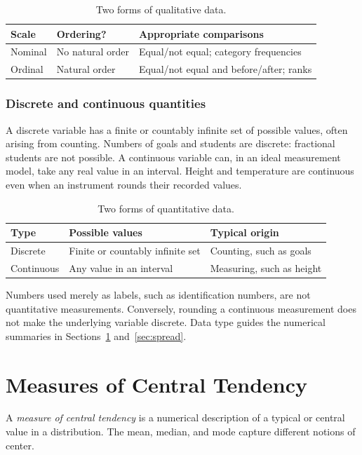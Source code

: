 \documentclass[11pt]{article}
\begin{document}
\begin{table}[ht]
\centering
\caption{Two forms of qualitative data.}
\begin{tabularx}{\textwidth}{@{}lYY@{}}
\toprule
Scale & Ordering? & Appropriate comparisons \\
\midrule
Nominal & No natural order & Equal/not equal; category frequencies \\
Ordinal & Natural order & Equal/not equal and before/after; ranks \\
\bottomrule
\end{tabularx}
\end{table}

\subsubsection{Discrete and continuous quantities}
A discrete variable has a finite or countably infinite set of possible
values, often arising from counting.  Numbers of goals and students are
discrete: fractional students are not possible.  A continuous variable can,
in an ideal measurement model, take any real value in an interval.  Height
and temperature are continuous even when an instrument rounds their recorded
values.

\begin{table}[ht]
\centering
\caption{Two forms of quantitative data.}
\begin{tabularx}{\textwidth}{@{}lYY@{}}
\toprule
Type & Possible values & Typical origin \\
\midrule
Discrete & Finite or countably infinite set & Counting, such as goals \\
Continuous & Any value in an interval & Measuring, such as height \\
\bottomrule
\end{tabularx}
\end{table}

\begin{keybox}
Numbers used merely as labels, such as identification numbers, are not
quantitative measurements.  Conversely, rounding a continuous measurement
does not make the underlying variable discrete.  Data type guides the
numerical summaries in Sections~\ref{sec:center} and~\ref{sec:spread}.
\end{keybox}

\section{Measures of Central Tendency}\label{sec:center}
A \emph{measure of central tendency} is a numerical description of a typical
or central value in a distribution.  The mean, median, and mode capture
different notions of center.
\end{document}
